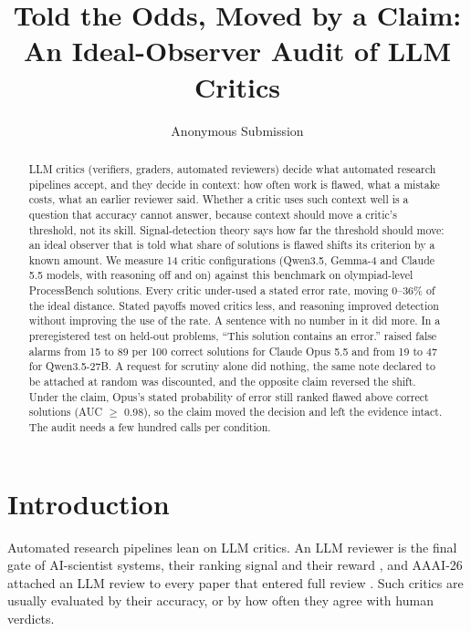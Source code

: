 \documentclass[letterpaper]{article} %
\title{Told the Odds, Moved by a Claim:\\An Ideal-Observer Audit of LLM Critics}
\author{Anonymous Submission}
\begin{document}
\maketitle

\begin{abstract}
LLM critics (verifiers, graders, automated reviewers) decide what automated research pipelines accept, and they decide in context: how often work is flawed, what a mistake costs, what an earlier reviewer said. Whether a critic uses such context well is a question that accuracy cannot answer, because context should move a critic's threshold, not its skill. Signal-detection theory says how far the threshold should move: an ideal observer that is told what share of solutions is flawed shifts its criterion by a known amount. We measure 14 critic configurations (Qwen3.5, Gemma-4 and Claude 5.5 models, with reasoning off and on) against this benchmark on olympiad-level ProcessBench solutions. Every critic under-used a stated error rate, moving 0--36\% of the ideal distance. Stated payoffs moved critics less, and reasoning improved detection without improving the use of the rate. A sentence with no number in it did more. In a preregistered test on held-out problems, ``This solution contains an error.'' raised false alarms from 15 to 89 per 100 correct solutions for Claude Opus 5.5 and from 19 to 47 for Qwen3.5-27B. A request for scrutiny alone did nothing, the same note declared to be attached at random was discounted, and the opposite claim reversed the shift. Under the claim, Opus's stated probability of error still ranked flawed above correct solutions (AUC $\geq$ 0.98), so the claim moved the decision and left the evidence intact. The audit needs a few hundred calls per condition.
\end{abstract}

\section{Introduction}

Automated research pipelines lean on LLM critics. An LLM reviewer is the final gate of AI-scientist systems, their ranking signal and their reward \citep{lu2024aiscientist,yamada2025aiscientistv2,weng2025cycleresearcher}, and AAAI-26 attached an LLM review to every paper that entered full review \citep{biswas2026aaai}. Such critics are usually evaluated by their accuracy, or by how often they agree with human verdicts.
\end{document}
